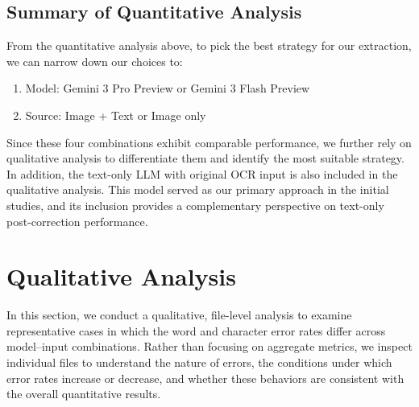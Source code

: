 \subsection{Summary of Quantitative Analysis}
From the quantitative analysis above, to pick the best strategy for our extraction, we can narrow down our choices to:
\begin{enumerate}
    \item Model: Gemini 3 Pro Preview or Gemini 3 Flash Preview
    \item Source: Image + Text or Image only
\end{enumerate}
Since these four combinations exhibit comparable performance, we further rely on qualitative analysis to differentiate them and identify the most suitable strategy. In addition, the text-only LLM with original OCR input is also included in the qualitative analysis. This model served as our primary approach in the initial studies, and its inclusion provides a complementary perspective on text-only post-correction performance.


\section{Qualitative Analysis}
In this section, we conduct a qualitative, file-level analysis to examine representative cases in which the word and character error rates differ across model–input combinations. Rather than focusing on aggregate metrics, we inspect individual files to understand the nature of errors, the conditions under which error rates increase or decrease, and whether these behaviors are consistent with the overall quantitative results.

